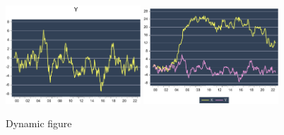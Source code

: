 \documentclass[
]{article}
\begin{document}
\begin{figure}[h]

{\centering \includegraphics[width=0.45\textwidth]{test_engEviews_files/figure-latex//sagirumati-sam-eviewsr_graph} \includegraphics[width=0.45\textwidth]{test_engEviews_files/figure-latex//sagirumati-sam-graph1} 

}

\caption{Dynamic figure}\label{fig:sagirumati}
\end{figure}
\end{document}

